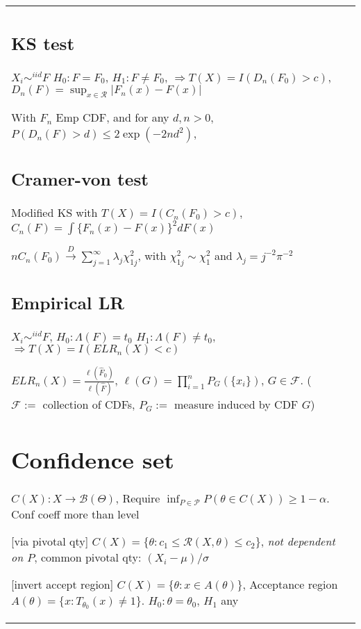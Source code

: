 \begin{tabulary}{\textwidth}{l || L}


	\subsection{KS test}

	$X_i\sim^{iid} F$
	$H_0: F=F_0$, $H_1: F \neq F_0$,
	$\Rightarrow T(X) = I(D_n(F_0) > c)$,
	$D_n(F) = \sup_{x\in\mathcal{R}}|F_n(x) - F(x)|$

	With $F_n$ Emp CDF, and
	for any $d, n > 0$, $P(D_n(F)>d)\leq 2\exp(-2nd^2)$,

	\subsection{Cramer-von test}

	Modified KS with $T(X) = I(C_n(F_0) > c)$,
	$C_n(F) = \int \{F_n(x) - F(x)\}^2 dF(x)$

	$nC_n(F_0)\xrightarrow{D} \sum_{j=1}^\infty \lambda_j \chi_{1j}^2$,
	with $\chi_{1j}^2 \sim \chi_1^2$ and $\lambda_j=j^{-2}\pi^{-2}$


	\subsection{Empirical LR}

	$X_i \sim^{iid} F$,
	$H_0: \Lambda(F)=t_0$ $H_1: \Lambda(F) \neq t_0$,
	$\Rightarrow T(X) = I(ELR_n(X) < c)$

	$ELR_n(X) = \frac{\ell(\hat{F}_0)}{\ell(\hat{F})}$,
	$\ell(G) = \prod_{i=1}^n P_G(\{x_i\})$, $G \in \mathcal{F}$.
	($\mathcal{F} :=$ collection of CDFs, $P_G :=$ measure induced by CDF $G$)

	\section{Confidence set}

	$C(X): X \rightarrow \mathcal{B}(\Theta)$,
	Require $\inf_{P\in\mathcal{P}} P(\theta\in C(X)) \geq 1 - \alpha$.
	Conf coeff more than level

		[via pivotal qty]
	$C(X) = \{\theta: c_1 \leq \mathcal{R}(X, \theta) \leq c_2\}$,
	\textit{not dependent on $P$}, common pivotal qty: $(X_i-\mu)/\sigma$

	[invert accept region]
	$C(X) = \{\theta: x\in A(\theta)\}$, Acceptance region $A(\theta)=\{x:
		T_{\theta_0}(x) \neq 1\}$.
	$H_0: \theta = \theta_0$, $H_1$ any



\end{tabulary}
